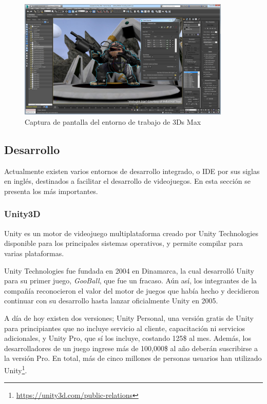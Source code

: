 \begin{figure}[!h]
\begin{center}
\includegraphics[width=0.9\textwidth]{imagenes/2/3ds-max.jpg}
\caption{Captura de pantalla del entorno de trabajo de 3Ds Max}
\label{fig:3ds-max}
\end{center}
\end{figure}

\subsection{Desarrollo}

Actualmente existen varios entornos de desarrollo integrado, o \acs{IDE} por sus siglas en inglés, destinados a facilitar el desarrollo de videojuegos. En esta sección se presenta los más importantes.

\subsubsection{Unity3D}

Unity es un motor de videojuego multiplataforma creado por Unity Technologies disponible para los principales sistemas operativos, y permite compilar para varias plataformas. 

Unity Technologies fue fundada en 2004 en Dinamarca, la cual desarrolló Unity para su primer juego, \textit{GooBall}, que fue un fracaso. Aún así, los integrantes de la compañía reconocieron el valor del motor de juegos que había hecho y decidieron continuar con su desarrollo hasta lanzar oficialmente Unity en 2005.  

A día de hoy existen dos versiones; Unity Personal, una versión gratis de Unity para principiantes que no incluye servicio al cliente, capacitación ni servicios adicionales, y Unity Pro, que sí los incluye, costando 125\$ al mes. Además, los desarrolladores de un juego ingrese más de 100,000\$ al año deberán suscribirse a la versión Pro. En total, más de cinco millones de personas usuarios han utilizado Unity\footnote{\url{https://unity3d.com/public-relations}}.


